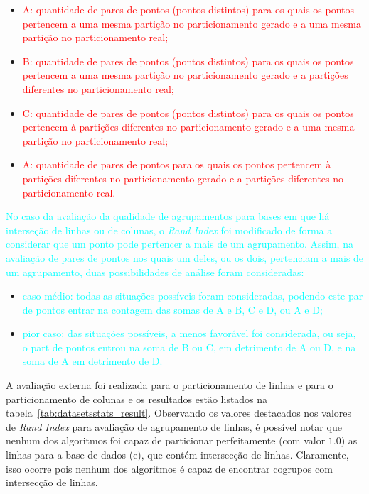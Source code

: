 \documentclass[
    12pt,                %
    oneside,            %
    a4paper,            %
    english,            %
    brazil                %
    ]{abntex2ppgsi}
\begin{document}
\begin{itemize}
\item \textcolor{red}{A: quantidade de pares de pontos (pontos distintos) para os quais os pontos pertencem a uma mesma partição no particionamento gerado e a uma mesma partição no particionamento real;}
\item \textcolor{red}{B: quantidade de pares de pontos (pontos distintos) para os quais os pontos pertencem a uma mesma partição no particionamento gerado e a partições diferentes no particionamento real;}
\item \textcolor{red}{C: quantidade de pares de pontos (pontos distintos) para os quais os pontos pertencem à partições diferentes no particionamento gerado e a uma mesma partição no particionamento real;}
\item \textcolor{red}{A: quantidade de pares de pontos para os quais os pontos pertencem à partições diferentes no particionamento gerado e a partições diferentes no particionamento real.}
\end{itemize}

\textcolor{cyan}{No caso da avaliação da qualidade de agrupamentos para bases em que há interseção de linhas ou de colunas, o \textit{Rand Index} foi modificado de forma a considerar que um ponto pode pertencer a mais de um agrupamento. Assim, na avaliação de pares de pontos nos quais um deles, ou os dois, pertenciam a mais de um agrupamento, duas possibilidades de análise foram consideradas:}

\begin{itemize}
\item \textcolor{cyan}{caso médio: todas as situações possíveis foram consideradas, podendo este par de pontos entrar na contagem das somas de A e B, C e D, ou A e D;}
\item \textcolor{cyan}{pior caso: das situações possíveis, a menos favorável foi considerada, ou seja, o part de pontos entrou na soma de B ou C, em detrimento de A ou D, e na soma de A em detrimento de D.}
\end{itemize}

A avaliação externa foi realizada para o particionamento de linhas e para o particionamento de colunas e os resultados estão listados na tabela~\ref{tab:datasetsstats_result}. Observando os valores destacados nos valores de \textit{Rand Index} para avaliação de agrupamento de linhas, é possível notar que nenhum dos algoritmos foi capaz de particionar perfeitamente (com valor $1.0$) as linhas para a base de dados (e), que contém intersecção de linhas. Claramente, isso ocorre pois nenhum dos algoritmos é capaz de encontrar cogrupos com intersecção de linhas.
\end{document}
